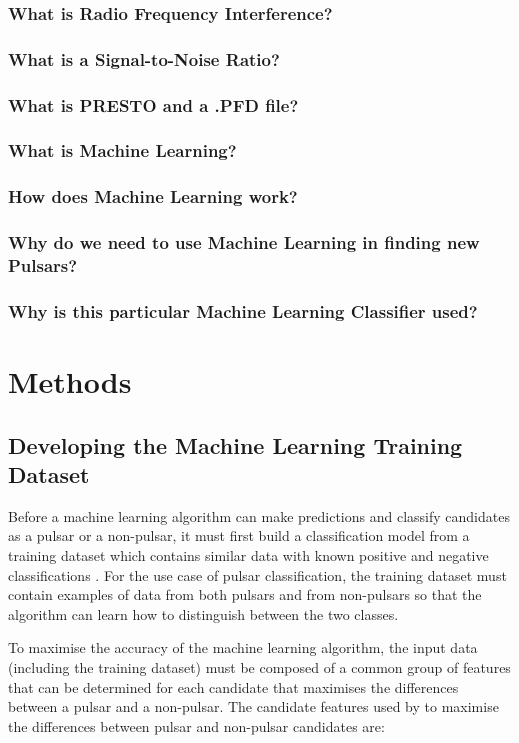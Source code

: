 \documentclass{article}
\begin{document}
\subsubsection{What is Radio Frequency Interference?}
\subsubsection{What is a Signal-to-Noise Ratio?}
\subsubsection{What is PRESTO and a .PFD file?}
\subsubsection{What is Machine Learning?}
\subsubsection{How does Machine Learning work?}
\subsubsection{Why do we need to use Machine Learning in finding new Pulsars?}
\subsubsection{Why is this particular Machine Learning Classifier used?}


\pagebreak
\section{Methods}
\subsection{Developing the Machine Learning Training Dataset}

Before a machine learning algorithm can make predictions and classify candidates as a pulsar or a non-pulsar, it must first build a classification model from a training dataset which contains similar data with known positive and negative classifications \autocite{tan, lyon}. For the use case of pulsar classification, the training dataset must contain examples of data from both pulsars and from non-pulsars so that the algorithm can learn how to distinguish between the two classes.

To maximise the accuracy of the machine learning algorithm, the input data (including the training dataset) must be composed of a common group of features that can be determined for each candidate that maximises the differences between a pulsar and a non-pulsar. The candidate features used by \smartcite{tan} to maximise the differences between pulsar and non-pulsar candidates are:
\end{document}
